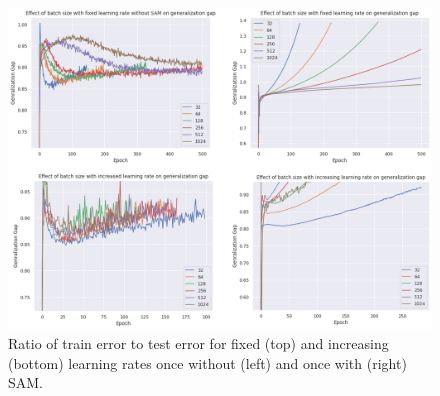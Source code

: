 \documentclass[10pt,conference,compsocconf]{IEEEtran}
\begin{document}
\begin{figure}[htbp]
  \centering
  \includegraphics[width=\columnwidth]{img/figure5_gen_gap}
  \caption{Ratio of train error to test error for fixed (top) and increasing (bottom) learning rates once without (left) and once with (right) SAM.}
  \vspace{-3mm}
  \label{fig:gen-gap}
\end{figure}
\end{document}
